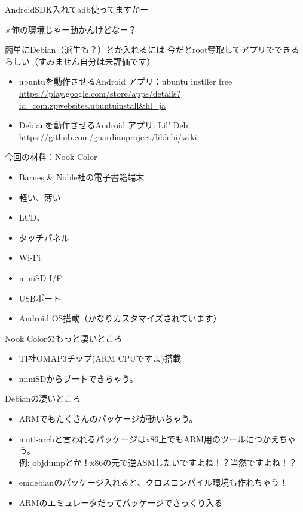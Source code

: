 \begin{frame}{AndroidSDK入れてadb使ってますかー}


※俺の環境じゃー動かんけどなー？

\end{frame}

\begin{frame}{簡単にDebian（派生も？）とか入れるには}
今だとroot奪取してアプリでできるらしい（すみません自分は未評価です）
\begin{itemize}
\item ubuntuを動作させるAndroid アプリ：ubuntu instller free \url{https://play.google.com/store/apps/details?id=com.zpwebsites.ubuntuinstall&hl=ja}
\item Debianを動作させるAndroid アプリ: Lil' Debi \url{https://github.com/guardianproject/lildebi/wiki}
\end{itemize}
\end{frame}

\begin{frame}{今回の材料：Nook Color}
\begin{itemize}
\item Barnes \& Noble社の電子書籍端末
\item 軽い、薄い
\item LCD、
\item タッチパネル
\item Wi-Fi
\item miniSD I/F
\item USBポート
\item Android OS搭載（かなりカスタマイズされています）
\end{itemize}
\end{frame}

\begin{frame}{Nook Colorのもっと凄いところ}
\begin{itemize}
\item TI社OMAP3チップ(ARM CPUですよ)搭載
\item miniSDからブートできちゃう。
\end{itemize}
\end{frame}

\begin{frame}{Debianの凄いところ}
\begin{itemize}
\item ARMでもたくさんのパッケージが動いちゃう。
\item muti-archと言われるパッケージはx86上でもARM用のツールにつかえちゃう。\\
例: objdumpとか！x86の元で逆ASMしたいですよね！？当然ですよね！？
\item emdebianのパッケージ入れると、クロスコンパイル環境も作れちゃう！
\item ARMのエミュレータだってパッケージでさっくり入る
\end{itemize}
\end{frame}

